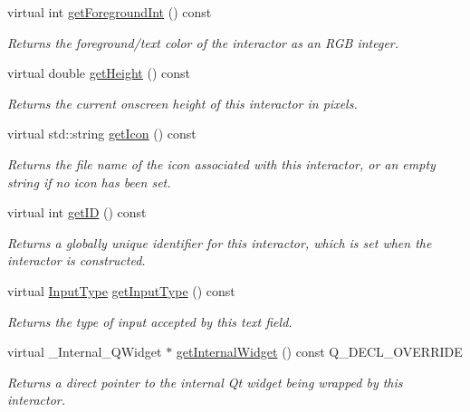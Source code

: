 \begin{DoxyCompactItemize}
virtual int \mbox{\hyperlink{classGInteractor_ac3b12ab385a6ef9ae90fc879860ba726}{get\+Foreground\+Int}} () const
\begin{DoxyCompactList}\small\item\em Returns the foreground/text color of the interactor as an R\+GB integer. \end{DoxyCompactList}\item 
virtual double \mbox{\hyperlink{classGInteractor_a1e7e353362434072875264cf95629f99}{get\+Height}} () const
\begin{DoxyCompactList}\small\item\em Returns the current onscreen height of this interactor in pixels. \end{DoxyCompactList}\item 
virtual std\+::string \mbox{\hyperlink{classGInteractor_aaed62a73004939a64da6f0eb9eb64d73}{get\+Icon}} () const
\begin{DoxyCompactList}\small\item\em Returns the file name of the icon associated with this interactor, or an empty string if no icon has been set. \end{DoxyCompactList}\item 
virtual int \mbox{\hyperlink{classGInteractor_a9c9659a6c6ba66b4107ba59c95a24241}{get\+ID}} () const
\begin{DoxyCompactList}\small\item\em Returns a globally unique identifier for this interactor, which is set when the interactor is constructed. \end{DoxyCompactList}\item 
virtual \mbox{\hyperlink{classGTextField_a5fc772c800c3d40d2b95564e8a839bab}{Input\+Type}} \mbox{\hyperlink{classGTextField_a69cc7c223d780203ab2852ee5a881753}{get\+Input\+Type}} () const
\begin{DoxyCompactList}\small\item\em Returns the type of input accepted by this text field. \end{DoxyCompactList}\item 
virtual \+\_\+\+Internal\+\_\+\+Q\+Widget $\ast$ \mbox{\hyperlink{classGTextField_a208ce13c1da40bf0ddb509daf99d6588}{get\+Internal\+Widget}} () const Q\+\_\+\+D\+E\+C\+L\+\_\+\+O\+V\+E\+R\+R\+I\+DE
\begin{DoxyCompactList}\small\item\em Returns a direct pointer to the internal Qt widget being wrapped by this interactor. \end{DoxyCompactList}\item 

\end{DoxyCompactItemize}

